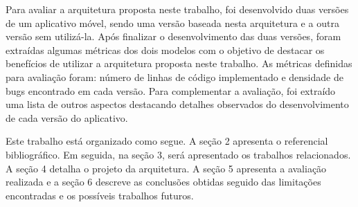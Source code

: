 Para avaliar a arquitetura proposta neste trabalho, foi desenvolvido duas versões de um aplicativo móvel, sendo uma versão baseada nesta arquitetura e a outra versão sem utilizá-la. Após finalizar o desenvolvimento das duas versões, foram extraídas algumas métricas dos dois modelos com o objetivo de destacar os benefícios de utilizar a arquitetura proposta neste trabalho. As métricas definidas para avaliação foram: número de linhas de código implementado e densidade de bugs encontrado em cada versão. Para complementar a avaliação, foi extraído uma lista de outros aspectos destacando detalhes observados do desenvolvimento de cada versão do aplicativo.

Este trabalho está organizado como segue. A seção 2 apresenta o referencial bibliográfico. Em seguida, na seção 3, será apresentado os trabalhos relacionados. A seção 4 detalha o projeto da arquitetura. A seção 5 apresenta a avaliação realizada e a seção 6 descreve as conclusões obtidas seguido das limitações encontradas e os possíveis trabalhos futuros.